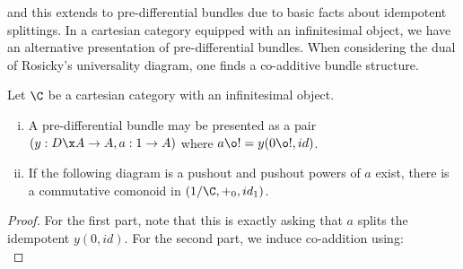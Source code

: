 and this extends to pre-differential bundles due to basic facts about idempotent splittings.
In a cartesian category equipped with an infinitesimal object, we have an alternative presentation of pre-differential bundles.
When considering the dual of Rosicky's universality diagram, one finds a co-additive bundle structure.
\begin{lemma}
	Let $\C$ be a cartesian category with an infinitesimal object.
	\begin{enumerate}[(i)]
		\item A pre-differential bundle may be presented as a pair $(y:D \x A \to A, a:1 \to A)$ where $a \o ! = y(0\o !, id)$.
		\item If the following diagram is a pushout and pushout powers of $a$ exist, there is a commutative comonoid in $(1/\C, +_0, id_1)$.
            \[\]
	\end{enumerate}
\end{lemma}
\begin{proof}
	For the first part, note that this is exactly asking that $a$ splits the idempotent $y(0,id)$.
	For the second part, we induce co-addition using:
    \[\]
\end{proof}

